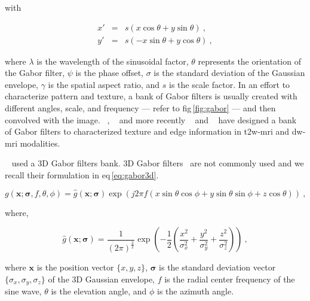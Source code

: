 \begin{enumerate}[leftmargin=*]
\noindent with

\begin{eqnarray}
  x' & = & s\left( x \cos \theta + y \sin \theta \right) \ , \nonumber \\
  y' & = & s \left( - x \sin \theta + y \cos \theta \right) \ , \nonumber
\end{eqnarray}

\noindent where $\lambda$ is the wavelength of the sinusoidal factor, $\theta$
represents the orientation of the Gabor filter, $\psi$ is the phase offset,
$\sigma$ is the standard deviation of the Gaussian envelope, $\gamma$ is the
spatial aspect ratio, and $s$ is the scale factor.
In an effort to characterize pattern and texture, a bank of Gabor filters is
usually created with different angles, scale, and frequency --- refer to
\acs{fig}\,\ref{fig:gabor} --- and then convolved with the image.
\citeauthor{Viswanath2012}~\cite{Viswanath2012},
\citeauthor{Tiwari2012}~\cite{Tiwari2012} and more recently
\citeauthor{khalvati2015automated}~\cite{khalvati2015automated} and
\citeauthor{chung2015prostate}~\cite{chung2015prostate} have designed a bank of
Gabor filters to characterized texture and edge information in
\ac{t2w}-\ac{mri} and \ac{dw}-\ac{mri} modalities.

\citeauthor{Lemaitre2016thesis}~\cite{Lemaitre2016thesis} used a 3D Gabor
filters bank.
3D Gabor filters~\cite{wang2005face} are not commonly used and we recall their
formulation in \acs*{eq}\,\eqref{eq:gabor3d}.

\begin{equation}
  g(\mathbf{x};\boldsymbol{\sigma},f,\theta,\phi) = \hat{g}(\mathbf{x};\boldsymbol{\sigma}) \exp(j 2 \pi f \left( x \sin \theta \cos \phi + y \sin \theta \sin \phi + z \cos \theta \right)) \ ,
  \label{eq:gabor3d}
\end{equation}

\noindent where,

\begin{equation}
  \hat{g}(\mathbf{x};\boldsymbol{\sigma}) = \frac{1}{{\left(2 \pi\right)}^{\frac{3}{2}}} \exp \left( -\frac{1}{2} \left( \frac{x^2}{\sigma_x^2} + \frac{y^2}{\sigma_y^2} + \frac{z^2}{\sigma_z^2} \right) \right) \ ,
  \label{eq:gabor3dgaussian}
\end{equation}

\noindent where $\mathbf{x}$ is the position vector $\{x,y,z\}$,
$\boldsymbol{\sigma}$ is the standard deviation vector
$\{\sigma_x,\sigma_y,\sigma_z\}$ of the 3D Gaussian envelope, $f$ is the radial
center frequency of the sine wave, $\theta$ is the elevation angle, and $\phi$
is the azimuth angle.


\end{enumerate}
